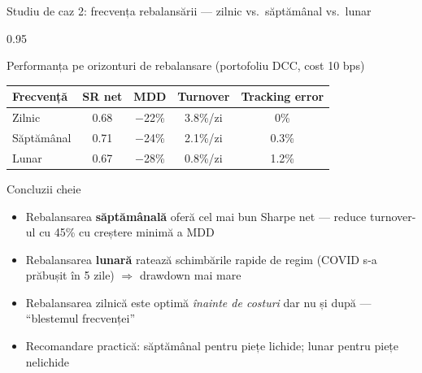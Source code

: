 \documentclass[9pt, aspectratio=169, t]{beamer}
\begin{document}
\begin{frame}{Studiu de caz 2: frecvența rebalansării --- zilnic vs.\ săptămânal vs.\ lunar}
    \begin{cminipage}{0.95\textwidth}
    {\footnotesize
    \begin{block}{Performanța pe orizonturi de rebalansare (portofoliu DCC, cost 10 bps)}
        \vspace{0.1cm}
        {\small
        \begin{center}
        \begin{tabular}{l|cccc}
            \hline
            \textbf{Frecvență} & \textbf{SR net} & \textbf{MDD} & \textbf{Turnover} & \textbf{Tracking error} \\
            \hline
            Zilnic      & 0.68 & $-$22\% & 3.8\%/zi & 0\% \\
            Săptămânal  & 0.71 & $-$24\% & 2.1\%/zi & 0.3\% \\
            Lunar       & 0.67 & $-$28\% & 0.8\%/zi & 1.2\% \\
            \hline
        \end{tabular}
        \end{center}
        }
    \end{block}
    \begin{alertblock}{Concluzii cheie}
        \begin{itemize}\setlength{\itemsep}{0pt}
            \item Rebalansarea \textbf{săptămânală} oferă cel mai bun Sharpe net --- reduce turnover-ul cu 45\% cu creștere minimă a MDD
            \item Rebalansarea \textbf{lunară} ratează schimbările rapide de regim (COVID s-a prăbușit în 5 zile) $\Rightarrow$ drawdown mai mare
            \item Rebalansarea zilnică este optimă \textit{înainte de costuri} dar nu și după --- ``blestemul frecvenței''
            \item Recomandare practică: săptămânal pentru piețe lichide; lunar pentru piețe nelichide
        \end{itemize}
    \end{alertblock}
    }
    \end{cminipage}
\end{frame}
\end{document}
